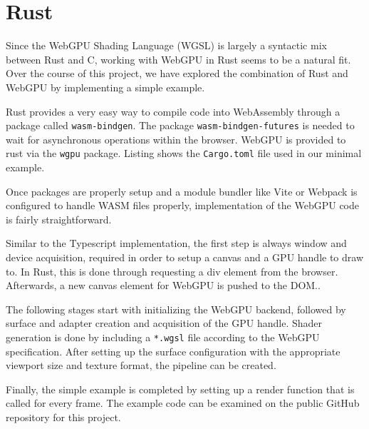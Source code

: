 %
%
% 
% 

\chapter{Rust}

\label{chap:Rust}

Since the WebGPU Shading Language (WGSL) is largely a syntactic mix between Rust and C,
working with WebGPU in Rust seems to be a natural fit.
Over the course of this project, we have explored the combination of Rust and WebGPU by implementing a simple example.

Rust provides a very easy way to compile code into WebAssembly through a package called \lstinline{wasm-bindgen}.
The package \lstinline{wasm-bindgen-futures} is needed to wait for asynchronous operations within the browser.
WebGPU is provided to rust via the \lstinline{wgpu} package.
Listing %
shows the \lstinline{Cargo.toml} file used in our minimal example.

Once packages are properly setup and a module bundler like Vite or Webpack is configured to handle WASM files properly,
implementation of the WebGPU code is fairly straightforward.

Similar to the Typescript implementation, the first step is always window and device acquisition, required in order
to setup a canvas and a GPU handle to draw to. In Rust, this is done through requesting a div element from the browser.
Afterwards, a new canvas element for WebGPU is pushed to the DOM..

The following stages start with initializing the WebGPU backend, followed by surface and adapter creation and acquisition
of the GPU handle.
Shader generation is done by including a \lstinline{*.wgsl} file according to the WebGPU specification.
After setting up the surface configuration with the appropriate viewport size and texture format, the pipeline can be created.

Finally, the simple example is completed by setting up a render function that is called for every frame.
The example code can be examined on the public GitHub repository for this project. %
